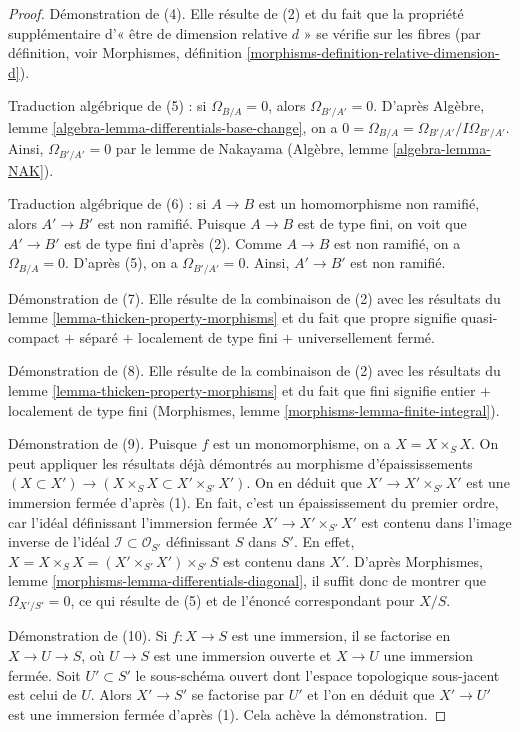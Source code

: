 \begin{proof}
\medskip\noindent
Démonstration de (4). Elle résulte de (2) et du fait que la propriété supplémentaire d'« être de
dimension relative $d$ » se vérifie sur les fibres (par définition, voir
Morphismes, définition \ref{morphisms-definition-relative-dimension-d}).

\medskip\noindent
Traduction algébrique de (5) : si $\Omega_{B/A} = 0$, alors
$\Omega_{B'/A'} = 0$. D'après
Algèbre, lemme \ref{algebra-lemma-differentials-base-change},
on a $0 = \Omega_{B/A} = \Omega_{B'/A'}/I\Omega_{B'/A'}$.
Ainsi, $\Omega_{B'/A'} = 0$ par le
lemme de Nakayama (Algèbre, lemme \ref{algebra-lemma-NAK}).

\medskip\noindent
Traduction algébrique de (6) : si $A \to B$ est un homomorphisme non ramifié,
alors $A' \to B'$ est non ramifié. Puisque $A \to B$ est de type
fini, on voit que $A' \to B'$ est de type fini d'après (2).
Comme $A \to B$ est non ramifié, on a $\Omega_{B/A} = 0$. D'après
(5), on a $\Omega_{B'/A'} = 0$. Ainsi, $A' \to B'$ est non ramifié.

\medskip\noindent
Démonstration de (7). Elle résulte de la combinaison de (2) avec
les résultats du lemme \ref{lemma-thicken-property-morphisms}
et du fait que propre signifie quasi-compact $+$
séparé $+$ localement de type fini $+$ universellement fermé.

\medskip\noindent
Démonstration de (8). Elle résulte de la combinaison de (2) avec
les résultats du lemme \ref{lemma-thicken-property-morphisms}
et du fait que fini signifie entier $+$ localement
de type fini (Morphismes, lemme \ref{morphisms-lemma-finite-integral}).

\medskip\noindent
Démonstration de (9). Puisque $f$ est un monomorphisme, on a $X = X \times_S X$.
On peut appliquer les résultats déjà démontrés au morphisme d'épaississements
$(X \subset X') \to (X \times_S X \subset X' \times_{S'} X')$.
On en déduit que $X' \to X' \times_{S'} X'$ est une immersion fermée d'après (1).
En fait, c'est un épaississement du premier ordre, car l'idéal définissant
l'immersion fermée
$X' \to X' \times_{S'} X'$ est contenu dans l'image inverse de l'idéal
$\mathcal{I} \subset \mathcal{O}_{S'}$ définissant $S$ dans $S'$.
En effet, $X = X \times_S X = (X' \times_{S'} X') \times_{S'} S$
est contenu dans $X'$. D'après
Morphismes, lemme \ref{morphisms-lemma-differentials-diagonal},
il suffit donc de montrer que
$\Omega_{X'/S'} = 0$, ce qui résulte de (5)
et de l'énoncé correspondant pour $X/S$.

\medskip\noindent
Démonstration de (10). Si $f : X \to S$ est une immersion, il se factorise en
$X \to U \to S$, où $U \to S$ est une immersion ouverte et $X \to U$ une
immersion fermée. Soit $U' \subset S'$ le sous-schéma ouvert dont
l'espace topologique sous-jacent est celui de $U$. Alors $X' \to S'$
se factorise par $U'$ et l'on en déduit que $X' \to U'$ est une immersion
fermée d'après (1). Cela achève la démonstration.
\end{proof}

